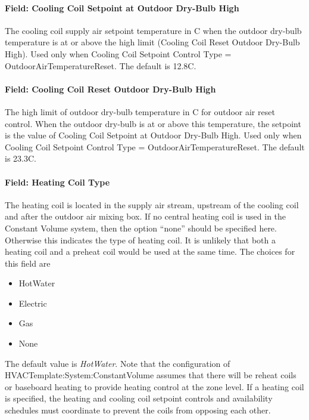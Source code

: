 \paragraph{Field: Cooling Coil Setpoint at Outdoor Dry-Bulb High}\label{field-cooling-coil-setpoint-at-outdoor-dry-bulb-high}

The cooling coil supply air setpoint temperature in C when the outdoor dry-bulb temperature is at or above the high limit (Cooling Coil Reset Outdoor Dry-Bulb High). Used only when Cooling Coil Setpoint Control Type = OutdoorAirTemperatureReset. The default is 12.8C.

\paragraph{Field: Cooling Coil Reset Outdoor Dry-Bulb High}\label{field-cooling-coil-reset-outdoor-dry-bulb-high}

The high limit of outdoor dry-bulb temperature in C for outdoor air reset control. When the outdoor dry-bulb is at or above this temperature, the setpoint is the value of Cooling Coil Setpoint at Outdoor Dry-Bulb High. Used only when Cooling Coil Setpoint Control Type = OutdoorAirTemperatureReset. The default is 23.3C.

\paragraph{Field: Heating Coil Type}\label{field-heating-coil-type-6}

The heating coil is located in the supply air stream, upstream of the cooling coil and after the outdoor air mixing box. If no central heating coil is used in the Constant Volume system, then the option ``none'' should be specified here. Otherwise this indicates the type of heating coil. It is unlikely that both a heating coil and a preheat coil would be used at the same time. The choices for this field are

\begin{itemize}
\item
  HotWater
\item
  Electric
\item
  Gas
\item
  None
\end{itemize}

The default value is \emph{HotWater}. Note that the configuration of HVACTemplate:System:ConstantVolume assumes that there will be reheat coils or baseboard heating to provide heating control at the zone level. If a heating coil is specified, the heating and cooling coil setpoint controls and availability schedules must coordinate to prevent the coils from opposing each other.

